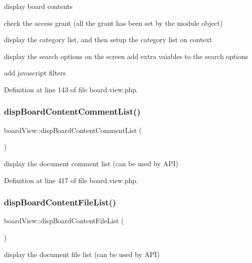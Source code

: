 display board contents 

check the access grant (all the grant has been set by the module object)

display the category list, and then setup the category list on context

display the search options on the screen add extra vaiables to the search options

add javascript filters

Definition at line 143 of file board.\+view.\+php.

\hypertarget{classboardView_abdb51dc39287afe90501939998733026}{}\label{classboardView_abdb51dc39287afe90501939998733026} 
\subsubsection{\texorpdfstring{disp\+Board\+Content\+Comment\+List()}{dispBoardContentCommentList()}}
{\footnotesize\ttfamily board\+View\+::disp\+Board\+Content\+Comment\+List (\begin{DoxyParamCaption}{ }\end{DoxyParamCaption})}



display the document comment list (can be used by A\+PI) 



Definition at line 417 of file board.\+view.\+php.

\hypertarget{classboardView_af652511173e1def272b5672844a92661}{}\label{classboardView_af652511173e1def272b5672844a92661} 
\subsubsection{\texorpdfstring{disp\+Board\+Content\+File\+List()}{dispBoardContentFileList()}}
{\footnotesize\ttfamily board\+View\+::disp\+Board\+Content\+File\+List (\begin{DoxyParamCaption}{ }\end{DoxyParamCaption})}



display the document file list (can be used by A\+PI) 

